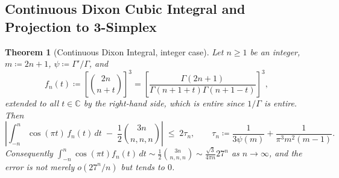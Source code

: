 \documentclass[11pt,a4paper]{article}
\theoremstyle{plain}
\newtheorem{theorem}{Theorem}[section]
\theoremstyle{definition}
\theoremstyle{remark}
\numberwithin{equation}{section}
\begin{document}
\subsection{Continuous Dixon Cubic Integral and Projection to 3-Simplex}

\begin{theorem}[Continuous Dixon Integral, integer case]
\label{conj:dixon}
Let $n \ge 1$ be an integer, $m \coloneqq 2n+1$, $\psi \coloneqq \Gamma'/\Gamma$, and
\[
f_n(t) \coloneqq \left[\binom{2n}{n+t}\right]^3 = \left[\frac{\Gamma(2n+1)}{\Gamma(n+1+t)\Gamma(n+1-t)}\right]^3,
\]
extended to all $t \in \mathbb{C}$ by the right-hand side, which is entire since $1/\Gamma$ is entire. Then
\begin{equation}
\left| \int_{-n}^n \cos(\pi t)\, f_n(t)\, dt \; - \; \frac12\binom{3n}{n,n,n} \right| \;\le\; 2\tau_n, \qquad
\tau_n \coloneqq \frac{1}{3\psi(m)} + \frac{1}{\pi^3 m^2(m-1)}.
\end{equation}
Consequently $\int_{-n}^n \cos(\pi t) f_n(t)\,dt \sim \frac12\binom{3n}{n,n,n} \sim \frac{\sqrt3}{4\pi n}27^n$ as $n \to \infty$, and the error is not merely $o(27^n/n)$ but tends to $0$.
\end{theorem}
\end{document}
